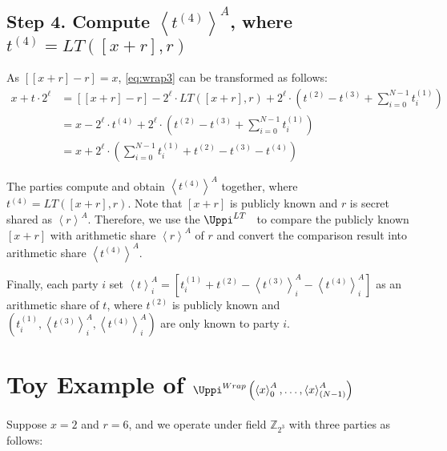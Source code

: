 \subsection{Step 4. Compute $\left\langle t^{\left(4\right) }\right\rangle^A $, where $t^{\left(4\right) }=LT\left(\left[x+r  \right] ,  r  \right) $}
\label{wrap:step4}

As $\left[ \left[x+r\right]   -r \right]=x$, \autoref{eq:wrap3} can be transformed as follows:
\begin{equation}
    \label{eq:wrap4}
    \begin{split}
        x + t\cdot 2^{\ell} &=  \left[ \left[x+r\right]   -r \right]     -2^{\ell} \cdot LT\left( \left[x+r  \right] ,r\right)+2^{\ell}\cdot \left(t^{(2)}  -  t^{\left(3\right) } +\sum_{i=0}^{N-1} t^{(1)}_i\right)\\
        &= x-2^{\ell} \cdot t^{\left(4\right) }+2^{\ell}\cdot \left(t^{(2)}  -  t^{\left(3\right) } +\sum_{i=0}^{N-1} t^{(1)}_i\right)\\
        &= x +2^{\ell}\cdot \left(\sum_{i=0}^{N-1} t^{(1)}_i+t^{(2)}  -  t^{\left(3\right)} -t^{\left(4\right) } \right)
    \end{split}
\end{equation}

The parties compute and obtain $\left\langle t^{\left(4\right) }\right\rangle^A $ together, where $t^{\left(4\right) }=LT\left(\left[x+r  \right] ,r\right) $. Note that $\left[x+r  \right] $ is publicly known and $r$ is secret shared as $\left\langle r\right\rangle^A $. Therefore, we use the $\Uppi^{LT}$~\cite{cryptoeprint:2021:119} to compare the publicly known $ \left[x+r  \right] $ with arithmetic share $\left\langle r\right\rangle ^A $ of $r$ and convert the comparison result into arithmetic share $\left\langle t^{\left(4\right) }\right\rangle^A$.

Finally, each party $i$ set $\left\langle t\right\rangle^A_i =\left[t^{(1)}_i+t^{\left(2\right) }-\left\langle t^{(3)}\right\rangle^A_i-\left\langle t^{(4)}\right\rangle^A_i \right] $ as an arithmetic share of $t$, where $t^{(2)}$ is publicly known and $\left(t_i^{\left(1\right) },\left\langle t^{(3)}\right\rangle^A_i,\left\langle t^{(4)}\right\rangle^A_i\right) $ are only known to party $i$.


\section{Toy Example of $\Uppi^{Wrap}\left(\left\langle x\right\rangle_0^A, \ldots ,\left\langle x\right\rangle_{\left(N-1\right)}^A  \right) $}
Suppose $x=2$ and $r=6$, and we operate under field $\mathbb{Z} _{2^{3}}$ with three parties as follows:

